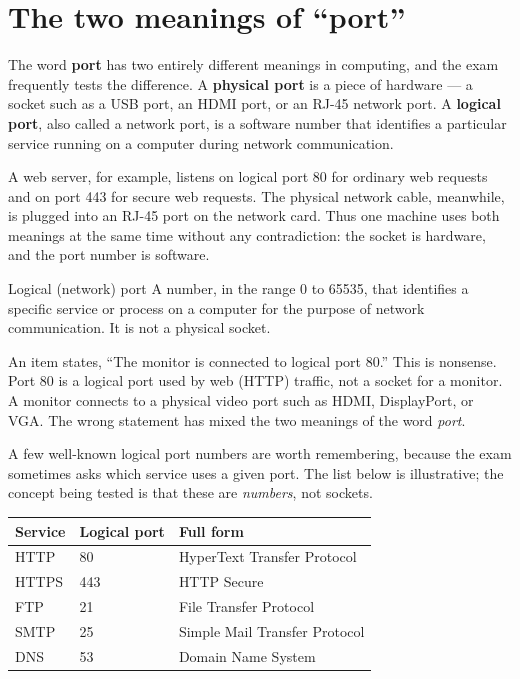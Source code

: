 \section{The two meanings of ``port''}
The word \textbf{port} has two entirely different meanings in computing, and
the exam frequently tests the difference. A \textbf{physical port} is a piece
of hardware --- a socket such as a USB port, an HDMI port, or an RJ-45
network port. A \textbf{logical port}, also called a network port, is a
software number that identifies a particular service running on a computer
during network communication.

A web server, for example, listens on logical port 80 for ordinary web
requests and on port 443 for secure web requests. The physical network cable,
meanwhile, is plugged into an RJ-45 port on the network card. Thus one
machine uses both meanings at the same time without any contradiction: the
socket is hardware, and the port number is software.

\begin{definitionbox}{Logical (network) port}
A number, in the range 0 to 65535, that identifies a specific service or
process on a computer for the purpose of network communication. It is not a
physical socket.
\end{definitionbox}

\begin{example}
An item states, ``The monitor is connected to logical port 80.'' This is
nonsense. Port 80 is a logical port used by web (HTTP) traffic, not a socket
for a monitor. A monitor connects to a physical video port such as HDMI,
DisplayPort, or VGA. The wrong statement has mixed the two meanings of the
word \emph{port}.
\end{example}

A few well-known logical port numbers are worth remembering, because the exam
sometimes asks which service uses a given port. The list below is
illustrative; the concept being tested is that these are \emph{numbers}, not
sockets.

\begin{center}
\begin{tabular}{p{}p{}p{}}
\toprule
\textbf{Service} & \textbf{Logical port} & \textbf{Full form} \\
\midrule
HTTP & 80 & HyperText Transfer Protocol \\
HTTPS & 443 & HTTP Secure \\
FTP & 21 & File Transfer Protocol \\
SMTP & 25 & Simple Mail Transfer Protocol \\
DNS & 53 & Domain Name System \\
\bottomrule
\end{tabular}
\end{center}

